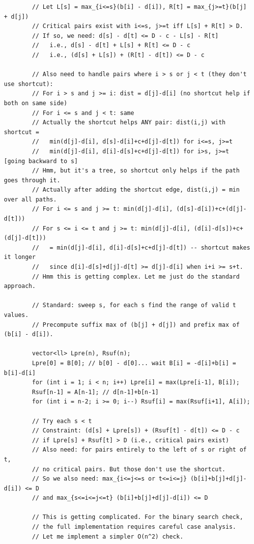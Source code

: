 \documentclass[11pt,a4paper]{article}
\begin{document}
\begin{lstlisting}
        // Let L[s] = max_{i<=s}(b[i] - d[i]), R[t] = max_{j>=t}(b[j] + d[j])
        // Critical pairs exist with i<=s, j>=t iff L[s] + R[t] > D.
        // If so, we need: d[s] - d[t] <= D - c - L[s] - R[t]
        //   i.e., d[s] - d[t] + L[s] + R[t] <= D - c
        //   i.e., (d[s] + L[s]) + (R[t] - d[t]) <= D - c

        // Also need to handle pairs where i > s or j < t (they don't use shortcut):
        // For i > s and j >= i: dist = d[j]-d[i] (no shortcut help if both on same side)
        // For i <= s and j < t: same
        // Actually the shortcut helps ANY pair: dist(i,j) with shortcut =
        //   min(d[j]-d[i], d[s]-d[i]+c+d[j]-d[t]) for i<=s, j>=t
        //   min(d[j]-d[i], d[i]-d[s]+c+d[j]-d[t]) for i>s, j>=t [going backward to s]
        // Hmm, but it's a tree, so shortcut only helps if the path goes through it.
        // Actually after adding the shortcut edge, dist(i,j) = min over all paths.
        // For i <= s and j >= t: min(d[j]-d[i], (d[s]-d[i])+c+(d[j]-d[t]))
        // For s <= i <= t and j >= t: min(d[j]-d[i], (d[i]-d[s])+c+(d[j]-d[t]))
        //   = min(d[j]-d[i], d[i]-d[s]+c+d[j]-d[t]) -- shortcut makes it longer
        //   since d[i]-d[s]+d[j]-d[t] >= d[j]-d[i] when i+i >= s+t.
        // Hmm this is getting complex. Let me just do the standard approach.

        // Standard: sweep s, for each s find the range of valid t values.
        // Precompute suffix max of (b[j] + d[j]) and prefix max of (b[i] - d[i]).

        vector<ll> Lpre(n), Rsuf(n);
        Lpre[0] = B[0]; // b[0] - d[0]... wait B[i] = -d[i]+b[i] = b[i]-d[i]
        for (int i = 1; i < n; i++) Lpre[i] = max(Lpre[i-1], B[i]);
        Rsuf[n-1] = A[n-1]; // d[n-1]+b[n-1]
        for (int i = n-2; i >= 0; i--) Rsuf[i] = max(Rsuf[i+1], A[i]);

        // Try each s < t
        // Constraint: (d[s] + Lpre[s]) + (Rsuf[t] - d[t]) <= D - c
        // if Lpre[s] + Rsuf[t] > D (i.e., critical pairs exist)
        // Also need: for pairs entirely to the left of s or right of t,
        // no critical pairs. But those don't use the shortcut.
        // So we also need: max_{i<=j<=s or t<=i<=j} (b[i]+b[j]+d[j]-d[i]) <= D
        // and max_{s<=i<=j<=t} (b[i]+b[j]+d[j]-d[i]) <= D

        // This is getting complicated. For the binary search check,
        // the full implementation requires careful case analysis.
        // Let me implement a simpler O(n^2) check.


\end{lstlisting}
\end{document}
